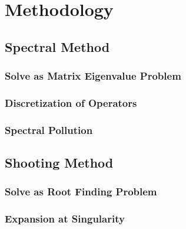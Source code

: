 \chapter{Methodology} \label{chap:methodology}

\section{Spectral Method}
\subsection{Solve as Matrix Eigenvalue Problem}
\subsection{Discretization of Operators}
\subsection{Spectral Pollution}


\section{Shooting Method}
\subsection{Solve as Root Finding Problem}
\subsection{Expansion at Singularity}